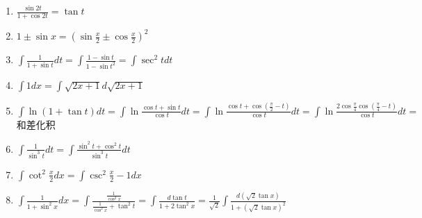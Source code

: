 \documentclass[UTF8]{ctexart}
\begin{document}
\begin{enumerate}
  \item $\frac{\sin 2t }{1+ \cos 2t}=\tan t$ \\
  \item $1 \pm \sin x ={(\sin \frac{x}{2} \pm \cos \frac{x}{2})}^2$ \\
  \item $\int \frac{1}{1+ \sin t }dt = \int \frac{1-\sin t}{1-{\sin t}^2}=\int \sec^2 tdt$ \\
  \item $\int 1 dx =\int \sqrt{2x+1} d \sqrt{2x+1}$ \\
  \item $\int \ln{(1+ \tan t)} dt = \int \ln \frac{\cos t +\sin t}{\cos t}dt=
  \int \ln \frac{\cos t + \cos (\frac{\pi}{2} -t ) }{\cos t} dt =
  \int \ln \frac{2 \cos \frac{\pi}{4} \cos (\frac{\pi}{4} -t)}{\cos t}dt =
$和差化积 \\
  \item $\int \frac{1}{\sin^3 t}dt =
\int \frac{\sin^2 t + \cos^2 t}{\sin^3 t }dt$
  \item $\int \cot^2 \frac{x}{2} dx= \int \csc^2 \frac{x}{2} -1 dx $
  \item $ \int \frac{1}{1+\sin^2 x} dx =\int \frac{\frac{1}{\cos^2 x}}{\frac {1}{\cos^2 x } + \tan^2 t}
  = \int \frac {d \tan t}{1+ 2\tan^2 x}
  = \frac{1}{\sqrt{2}} \int \frac{d ( \sqrt {2} \tan x)}{1+ {(\sqrt{2} \tan x)}^2}$
\end{enumerate}
\end{document}
